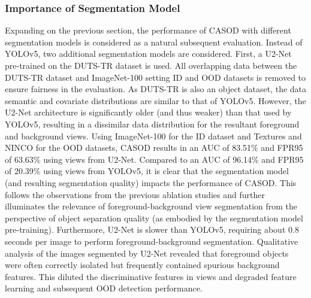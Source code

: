 \subsubsection{Importance of Segmentation Model}
\label{sec:suppmat-altsegmod}

Expanding on the previous section, the performance of CASOD with different segmentation models is considered as a natural subsequent evaluation. Instead of YOLOv5, two additional segmentation models %
are considered. First, a U2-Net pre-trained on the DUTS-TR dataset \cite{wang2017learning} is used. All overlapping data between the DUTS-TR dataset and ImageNet-100 setting ID and OOD datasets is removed to ensure fairness in the evaluation. As DUTS-TR is also an object dataset, the data semantic and covariate distributions are similar to that of YOLOv5. However, the U2-Net architecture is significantly older (and thus weaker) than that used by YOLOv5, resulting in a dissimilar data distribution for the resultant foreground and background views. Using ImageNet-100 for the ID dataset and Textures and NINCO for the OOD datasets, CASOD results in an AUC of 83.51\% and FPR95 of 63.63\% using views from U2-Net. Compared to an AUC of 96.14\% and FPR95 of 20.39\% using views from YOLOv5, it is clear that the segmentation model (and resulting segmentation quality) impacts the performance of CASOD. This follows the observations from the previous ablation studies and further illuminates the relevance of foreground-background view segmentation from the perspective of object separation quality (as embodied by the segmentation model pre-training). Furthermore, U2-Net is slower than YOLOv5, requiring about 0.8 seconds per image to perform foreground-background segmentation. Qualitative analysis of the images segmented by U2-Net revealed that foreground objects were often correctly isolated but frequently contained spurious background features. This diluted the discriminative features in views and degraded feature learning and subsequent OOD detection performance.

\begin{table}[htp!]
	\small
	\centering
\vspace{0.1cm}
	\caption{ 
		Ablation OOD detection results (AUC) for ImageNet-100 ID between \sys with LoRA ViT feature extractor backbones and \sys with CLIP vision feature extractor backbone. %
	}
	\label{tab:clip_ablation}
\end{table}

